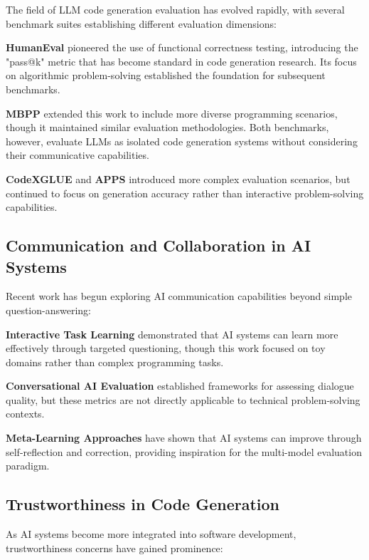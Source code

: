 \documentclass[conference]{IEEEtran}
\begin{document}
The field of LLM code generation evaluation has evolved rapidly, with several benchmark suites establishing different evaluation dimensions:

\textbf{HumanEval} \cite{chen2021evaluating} pioneered the use of functional correctness testing, introducing the "pass@k" metric that has become standard in code generation research. Its focus on algorithmic problem-solving established the foundation for subsequent benchmarks.

\textbf{MBPP} \cite{austin2021program} extended this work to include more diverse programming scenarios, though it maintained similar evaluation methodologies. Both benchmarks, however, evaluate LLMs as isolated code generation systems without considering their communicative capabilities.

\textbf{CodeXGLUE} \cite{lu2021codexglue} and \textbf{APPS} \cite{hendrycks2021measuring} introduced more complex evaluation scenarios, but continued to focus on generation accuracy rather than interactive problem-solving capabilities.

\subsection{Communication and Collaboration in AI Systems}

Recent work has begun exploring AI communication capabilities beyond simple question-answering:

\textbf{Interactive Task Learning} \cite{wang2021towards} demonstrated that AI systems can learn more effectively through targeted questioning, though this work focused on toy domains rather than complex programming tasks.

\textbf{Conversational AI Evaluation} \cite{adiwardana2020towards} established frameworks for assessing dialogue quality, but these metrics are not directly applicable to technical problem-solving contexts.

\textbf{Meta-Learning Approaches} \cite{finn2017model} have shown that AI systems can improve through self-reflection and correction, providing inspiration for the multi-model evaluation paradigm.

\subsection{Trustworthiness in Code Generation}

As AI systems become more integrated into software development, trustworthiness concerns have gained prominence:
\end{document}
